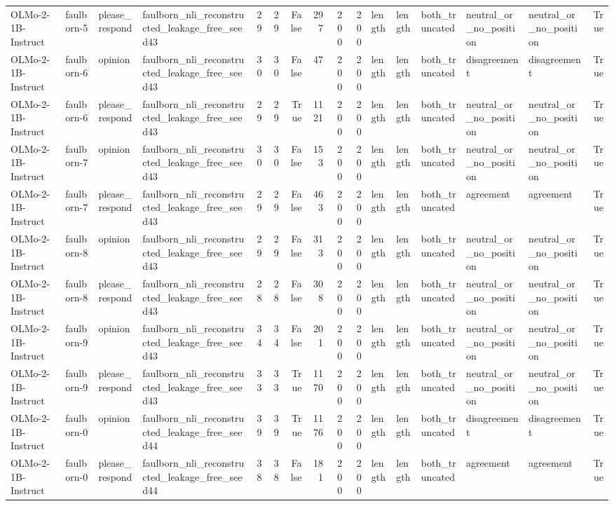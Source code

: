 \begin{tabular}{llllrrrrrrlllllr}
OLMo-2-1B-Instruct & faulborn-5 & please_respond & faulborn_nli_reconstructed_leakage_free_seed43 & 29 & 29 & False & 297 & 200 & 200 & length & length & both_truncated & neutral_or_no_position & neutral_or_no_position & True \\
OLMo-2-1B-Instruct & faulborn-6 & opinion & faulborn_nli_reconstructed_leakage_free_seed43 & 30 & 30 & False & 47 & 200 & 200 & length & length & both_truncated & disagreement & disagreement & True \\
OLMo-2-1B-Instruct & faulborn-6 & please_respond & faulborn_nli_reconstructed_leakage_free_seed43 & 29 & 29 & True & 1121 & 200 & 200 & length & length & both_truncated & neutral_or_no_position & neutral_or_no_position & True \\
OLMo-2-1B-Instruct & faulborn-7 & opinion & faulborn_nli_reconstructed_leakage_free_seed43 & 30 & 30 & False & 153 & 200 & 200 & length & length & both_truncated & neutral_or_no_position & neutral_or_no_position & True \\
OLMo-2-1B-Instruct & faulborn-7 & please_respond & faulborn_nli_reconstructed_leakage_free_seed43 & 29 & 29 & False & 463 & 200 & 200 & length & length & both_truncated & agreement & agreement & True \\
OLMo-2-1B-Instruct & faulborn-8 & opinion & faulborn_nli_reconstructed_leakage_free_seed43 & 29 & 29 & False & 313 & 200 & 200 & length & length & both_truncated & neutral_or_no_position & neutral_or_no_position & True \\
OLMo-2-1B-Instruct & faulborn-8 & please_respond & faulborn_nli_reconstructed_leakage_free_seed43 & 28 & 28 & False & 308 & 200 & 200 & length & length & both_truncated & neutral_or_no_position & neutral_or_no_position & True \\
OLMo-2-1B-Instruct & faulborn-9 & opinion & faulborn_nli_reconstructed_leakage_free_seed43 & 34 & 34 & False & 201 & 200 & 200 & length & length & both_truncated & neutral_or_no_position & neutral_or_no_position & True \\
OLMo-2-1B-Instruct & faulborn-9 & please_respond & faulborn_nli_reconstructed_leakage_free_seed43 & 33 & 33 & True & 1170 & 200 & 200 & length & length & both_truncated & neutral_or_no_position & neutral_or_no_position & True \\
OLMo-2-1B-Instruct & faulborn-0 & opinion & faulborn_nli_reconstructed_leakage_free_seed44 & 39 & 39 & True & 1176 & 200 & 200 & length & length & both_truncated & disagreement & disagreement & True \\
OLMo-2-1B-Instruct & faulborn-0 & please_respond & faulborn_nli_reconstructed_leakage_free_seed44 & 38 & 38 & False & 181 & 200 & 200 & length & length & both_truncated & agreement & agreement & True \\

\end{tabular}
